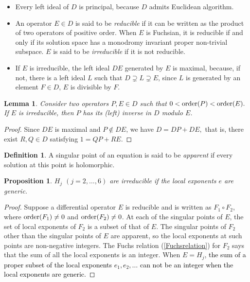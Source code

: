 \documentclass[a4paper,12pt]{article}
\newtheorem{lemma}[thm]{Lemma}
\newtheorem{prp}[thm]{Proposition}
\theoremstyle{definition}
\newtheorem{dfn}[thm]{Definition}
\theoremstyle{remark}
\numberwithin{equation}{section} %
\newcommand{\blue}[1]{\textcolor{black}{#1}}
\begin{document}
\begin{itemize}[leftmargin=36pt] %
\item Every left ideal of $D$ is principal, because $D$ admits Euclidean algorithm.

\item An operator $E\in D$ is said to be {\it reducible} if it can be written as the product of two operators of positive order. When $E$ is Fuchsian, it is reducible if and only if its solution space has a monodromy invariant proper non-trivial subspace. $E$ is said to be {\it irreducible} if it is not reducible.

\item If $E$ is irreducible, the left ideal $DE$ generated by $E$ is maximal, because, if not, there is a left ideal $L$ such that $D\supsetneq L\supsetneq E$, since $L$ is generated by an element $F\in D$, $E$ is divisible by $F$.
\end{itemize}

\begin{lemma}\label{inverseofP}
  Consider two operators $P,E\in D$ such that $0<{\rm order}(P)<{\rm order}(E).$
  If $E$ is irreducible, then $P$ has its (left) inverse in $D$ modulo $E$.
\end{lemma}
\begin{proof} %
  Since $DE$ is maximal and $P\not\in DE$, we have $D=DP+DE,$ that is, there exist $R,Q\in D$ satisfying $1=QP+RE$.
\end{proof} %

\begin{dfn}A singular point of an equation is said to be {\it apparent} if every solution at this point is holomorphic. 
\end{dfn}

\begin{prp}\label{generic_is_irred}$H_j$ $(j=2,\dots,6)$ are irreducible if the local exponents $e$  are generic.
\end{prp}

\begin{proof} Suppose a differential operator $E$ is reducible and is written as $F_1\circ F_2$, where ${\rm order}(F_1)\neq 0$ and ${\rm order}(F_2)\neq 0$.
At each of the singular points of $E$, %
the set of local exponents of $F_2$ is a subset of that of $E$. The singular points of $F_2$ other than the  singular points of $E$ are apparent, so the local exponents at such points are non-negative integers. The Fuchs relation (\ref{Fuchsrelation}) for $F_2$ says that the sum of all the local exponents is an integer.  When $E=H_j$, \blue{the sum of a proper subset of the local exponents $e_1,e_2,\dots$ can not be an integer when the local exponents are generic.}
\end{proof} %
\end{document}

